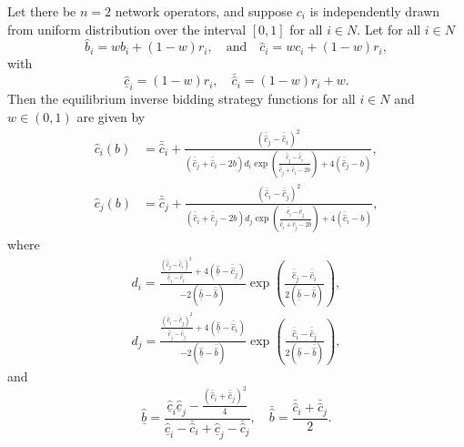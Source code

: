 \begin{proposition}
\label{prop:inverse_equi_bidding_str_indirect}
Let there be $n=2$ network operators, and suppose $c_i$ is independently drawn from uniform distribution over the interval $[0,1]$ for all $i\in N$. Let for all $i\in N$
\begin{equation*}
  \hat{b}_i = wb_i + (1-w)r_i,\quad\text{and}\quad \hat{c}_i = wc_i + (1-w)r_i,
\end{equation*}
with
\begin{equation}
  \label{eq:cost_hat_bounds_indirect}
  \underline{\hat{c}}_i = (1-w)r_i,\quad \bar{\hat{c}}_i = (1-w)r_i + w.
\end{equation}
Then the equilibrium inverse bidding strategy functions for all $i\in N$ and $w\in (0,1)$ are given by
\begin{align}
  \label{eq:inverse_equi_bidding_str_i_indirect}
  \hat{c}_i(b) &= \bar{\hat{c}}_i + \frac{(\bar{\hat{c}}_j - \bar{\hat{c}}_i)^2}{(\bar{\hat{c}}_j + \bar{\hat{c}}_i - 2b)d_i \exp{\left(\displaystyle\frac{\bar{\hat{c}}_j - \bar{\hat{c}}_i}{\bar{\hat{c}}_j + \bar{\hat{c}}_i - 2b}\right)} + 4(\bar{\hat{c}}_j - b)},\\[2ex]
  \label{eq:inverse_equi_bidding_str_j_indirect}
  \hat{c}_j(b) &= \bar{\hat{c}}_j + \frac{(\bar{\hat{c}}_i - \bar{\hat{c}}_j)^2}{(\bar{\hat{c}}_i + \bar{\hat{c}}_j - 2b)d_j \exp{\left(\displaystyle\frac{\bar{\hat{c}}_i - \bar{\hat{c}}_j}{\bar{\hat{c}}_i + \bar{\hat{c}}_j - 2b}\right)} + 4(\bar{\hat{c}}_i - b)},
\end{align}
where
\begin{align}
  \label{eq:constant_d_i_indirect}
  d_i = \frac{\displaystyle\frac{(\bar{\hat{c}}_j - \bar{\hat{c}}_i)^2}{\underline{\hat{c}}_i - \bar{\hat{c}}_i} + 4(\underline{\hat{b}} - \bar{\hat{c}}_j)}{-2(\underline{\hat{b}} - \bar{\hat{b}})} \exp{\left(\displaystyle\frac{\bar{\hat{c}}_j - \bar{\hat{c}}_i}{2(\underline{\hat{b}} - \bar{\hat{b}})}\right)}, \\[2ex]
  \label{eq:constant_d_j_indirect}
  d_j = \frac{\displaystyle\frac{(\bar{\hat{c}}_i - \bar{\hat{c}}_j)^2}{\underline{\hat{c}}_j - \bar{\hat{c}}_j} + 4(\underline{\hat{b}} - \bar{\hat{c}}_i)}{-2(\underline{\hat{b}} - \bar{\hat{b}})} \exp{\left(\frac{\bar{\hat{c}}_i - \bar{\hat{c}}_j}{2(\underline{\hat{b}} - \bar{\hat{b}})}\right)},
\end{align}
and
\begin{equation}
  \label{eq:bid_bounds_indirect}
  \underline{\hat{b}} = \frac{\underline{\hat{c}}_i\underline{\hat{c}}_j - \displaystyle\frac{(\bar{\hat{c}}_i + \bar{\hat{c}}_j)^2}{4}}{\underline{\hat{c}}_i - \bar{\hat{c}}_i + \underline{\hat{c}}_j - \bar{\hat{c}}_j},\quad
  \bar{\hat{b}} = \frac{\bar{\hat{c}}_i + \bar{\hat{c}}_j}{2}.
\end{equation}
\end{proposition}
